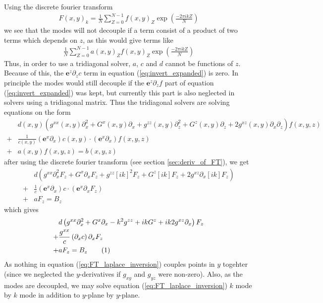 \documentclass[12pt]{article}
\def\L{\left}
\def\R{\right}
\newcommand{\ve}[1]{\ensuremath{\boldsymbol{#1}}}
\newcommand\numberthis{\addtocounter{equation}{1}\tag{\theequation}}
\begin{document}
Using the discrete fourier transform
%
\begin{align}
    F(x,y)_{k} = \frac{1}{N}\sum_{Z=0}^{N-1}f(x,y)_{Z}\exp\L(\frac{-2\pi i k
    Z}{N}\R)
\end{align}
%
we see that the modes will not decouple if a term consist of a product of two
terms which depends on $z$, as this would give terms like
%
\begin{align*}
    \frac{1}{N}\sum_{Z=0}^{N-1} a(x,y)_Z f(x,y)_Z \exp\L(\frac{-2\pi i k
    Z}{N}\R)
\end{align*}
%
Thus, in order to use a tridiagonal solver, $a$, $c$ and $d$ cannot be
functions of $z$. Because of this, the $\ve{e}^z \partial_z c$ term in equation
(\ref{eq:invert_expanded}) is zero. In principle the modes would still decouple
if the $\ve{e}^z \partial_z f$ part of equation (\ref{eq:invert_expanded}) was
kept, but currently this part is also neglected in solvers using a tridiagonal
matrix. Thus the tridiagonal solvers are solving equations on the form
%
\begin{align*}
    \, &d(x,y) \L(    g^{xx}(x,y) \partial_x^2 + G^x(x,y) \partial_x +
    g^{zz}(x,y) \partial_z^2 + G^z(x,y) \partial_z + 2g^{xz}(x,y) \partial_x
    \partial_z \R) f(x,y,z) \\
%
    +& \frac{1}{c(x,y)}\L( \ve{e}^x \partial_x \R) c(x,y) \cdot \L( \ve{e}^x
    \partial_x \R) f(x,y,z) \\
%
   +& a(x,y)f(x,y,z) = b(x,y,z)
\end{align*}
%
after using the discrete fourier transform (see section \ref{sec:deriv_of_FT}),
we get
%
\begin{align*}
    \, &d \L(    g^{xx} \partial_x^2F_z + G^x \partial_xF_z + g^{zz} [i k]^2F_z
    + G^z [i k]F_z + 2g^{xz} \partial_x[i k]F_z \R) \\
%
    +& \frac{1}{c}\L( \ve{e}^x \partial_x \R) c \cdot \L( \ve{e}^x
    \partial_xF_z \R) \\
%
    +& aF_z = B_z
\end{align*}
%
which gives
%
\begin{align*}
    \, &d \L(    g^{xx} \partial_x^2 + G^x \partial_x - k^2 g^{zz} + i kG^z + i
    k2g^{xz} \partial_x \R)F_z \\
%
    +& \frac{g^{xx}}{c} \L( \partial_x c \R) \partial_xF_z \\
%
    +& aF_z = B_z \numberthis
%
\label{eq:FT_laplace_inversion}
%
\end{align*}
%
As nothing in equation (\ref{eq:FT_laplace_inversion}) couples points in $y$
togehter (since we neglected the $y$-derivatives if $g_{xy}$ and $g_{yz}$ were
non-zero). Also, as the modes are decoupled, we may solve equation
(\ref{eq:FT_laplace_inversion})  $k$ mode by $k$ mode in addition to $y$-plane
by $y$-plane.
\end{document}
